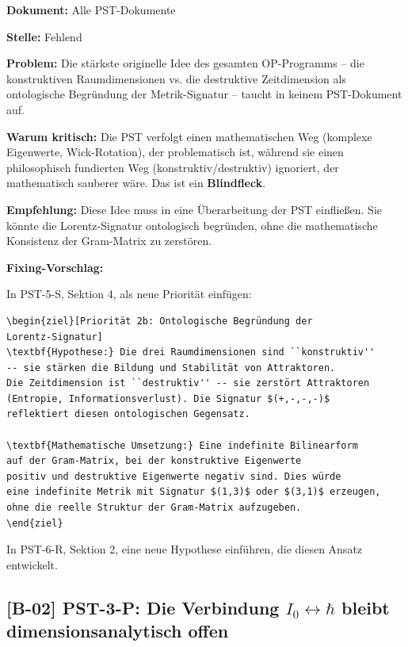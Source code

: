 \documentclass[11pt,a4paper]{article}
\newcommand{\B}[1]{\textbf{[B-#1]}}
\newcommand{\Dok}[1]{\noindent\textbf{Dokument:} #1\par\smallskip}
\newcommand{\Stelle}[1]{\noindent\textbf{Stelle:} #1\par\smallskip}
\newcommand{\Prob}[1]{\noindent\textbf{Problem:} #1\par\smallskip}
\newcommand{\Krit}[1]{\noindent\textbf{Warum kritisch:} #1\par\smallskip}
\newcommand{\Empf}[1]{\noindent\textbf{Empfehlung:} #1\par\smallskip}
\newenvironment{Fix}
  {\par\medskip\noindent\textbf{Fixing-Vorschlag:}\par\nobreak\smallskip}
  {\par\medskip}
\begin{document}
\Dok{Alle PST-Dokumente}
\Stelle{Fehlend}
\Prob{Die stärkste originelle Idee des gesamten OP-Programms --
die konstruktiven Raumdimensionen vs. die destruktive Zeitdimension
als ontologische Begründung der Metrik-Signatur -- taucht in
keinem PST-Dokument auf.}
\Krit{Die PST verfolgt einen mathematischen Weg (komplexe
Eigenwerte, Wick-Rotation), der problematisch ist, während sie
einen philosophisch fundierten Weg (konstruktiv/destruktiv)
ignoriert, der mathematisch sauberer wäre. Das ist ein
\textbf{Blindfleck}.}
\Empf{Diese Idee muss in eine Überarbeitung der PST
einfließen. Sie könnte die Lorentz-Signatur ontologisch
begründen, ohne die mathematische Konsistenz der Gram-Matrix zu
zerstören.}
\begin{Fix}
In PST-5-S, Sektion 4, als neue Priorität einfügen:
\begin{verbatim}
\begin{ziel}[Priorität 2b: Ontologische Begründung der
Lorentz-Signatur]
\textbf{Hypothese:} Die drei Raumdimensionen sind ``konstruktiv''
-- sie stärken die Bildung und Stabilität von Attraktoren.
Die Zeitdimension ist ``destruktiv'' -- sie zerstört Attraktoren
(Entropie, Informationsverlust). Die Signatur $(+,-,-,-)$
reflektiert diesen ontologischen Gegensatz.

\textbf{Mathematische Umsetzung:} Eine indefinite Bilinearform
auf der Gram-Matrix, bei der konstruktive Eigenwerte
positiv und destruktive Eigenwerte negativ sind. Dies würde
eine indefinite Metrik mit Signatur $(1,3)$ oder $(3,1)$ erzeugen,
ohne die reelle Struktur der Gram-Matrix aufzugeben.
\end{ziel}
\end{verbatim}
In PST-6-R, Sektion 2, eine neue Hypothese einführen, die diesen
Ansatz entwickelt.
\end{Fix}

\subsection{\B{02} PST-3-P: Die Verbindung $I_0 \leftrightarrow \hbar$
bleibt dimensionsanalytisch offen}
\end{document}
